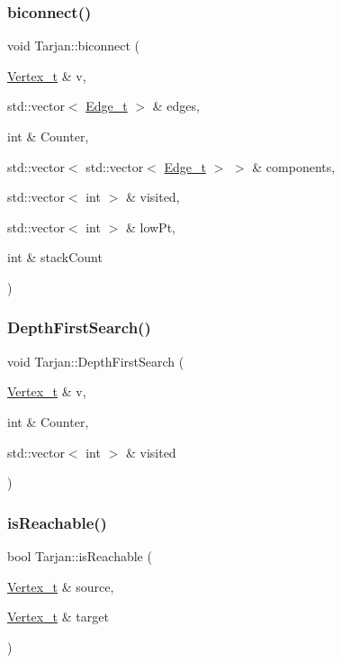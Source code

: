 \subsubsection{\texorpdfstring{biconnect()}{biconnect()}}
{\footnotesize\ttfamily void Tarjan\+::biconnect (\begin{DoxyParamCaption}\item[{\hyperlink{class_graph_component_ae67114a6ce5a001dc35e1996e1b45aa0}{Vertex\+\_\+t} \&}]{v,  }\item[{std\+::vector$<$ \hyperlink{utilities_8h_af4a84c740ebb77e6a13a00aa289b0018}{Edge\+\_\+t} $>$ \&}]{edges,  }\item[{int \&}]{Counter,  }\item[{std\+::vector$<$ std\+::vector$<$ \hyperlink{utilities_8h_af4a84c740ebb77e6a13a00aa289b0018}{Edge\+\_\+t} $>$ $>$ \&}]{components,  }\item[{std\+::vector$<$ int $>$ \&}]{visited,  }\item[{std\+::vector$<$ int $>$ \&}]{low\+Pt,  }\item[{int \&}]{stack\+Count }\end{DoxyParamCaption})}

\mbox{\label{class_tarjan_a277c58dc6f712a6ae1ef2e59c9ad58e1}} 
\subsubsection{\texorpdfstring{Depth\+First\+Search()}{DepthFirstSearch()}}
{\footnotesize\ttfamily void Tarjan\+::\+Depth\+First\+Search (\begin{DoxyParamCaption}\item[{\hyperlink{class_graph_component_ae67114a6ce5a001dc35e1996e1b45aa0}{Vertex\+\_\+t} \&}]{v,  }\item[{int \&}]{Counter,  }\item[{std\+::vector$<$ int $>$ \&}]{visited }\end{DoxyParamCaption})}

\mbox{\label{class_tarjan_a74f69dfaa1d4cf3bac06aef7a704c0b8}} 
\subsubsection{\texorpdfstring{is\+Reachable()}{isReachable()}}
{\footnotesize\ttfamily bool Tarjan\+::is\+Reachable (\begin{DoxyParamCaption}\item[{\hyperlink{class_graph_component_ae67114a6ce5a001dc35e1996e1b45aa0}{Vertex\+\_\+t} \&}]{source,  }\item[{\hyperlink{class_graph_component_ae67114a6ce5a001dc35e1996e1b45aa0}{Vertex\+\_\+t} \&}]{target }\end{DoxyParamCaption})}

